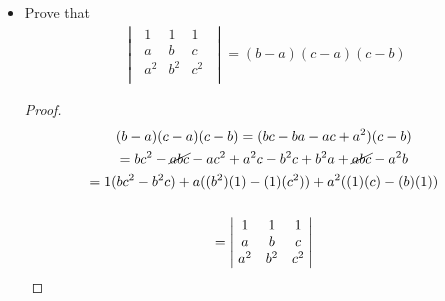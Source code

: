 \documentclass[10pt]{extarticle}
\newcommand{\itembf}[1]{\item[\textbf{#1}]}
\begin{document}
\begin{itemize}
			
		(e) $\begin{vmatrix}
				\; 2 & -1 & 3 & 1  \;\\
				\; 0 & 2 & -2 & -1 \;\\
				\; 4 & -2 & 1 & 0  \;\\
				\; 0 & 2 & -7 & -3  \;\\
			\end{vmatrix}=-5
			\begin{vmatrix}
				\; 2 & -1  & 1  \;\\
				\; 4 & -2  & 0  \;\\
				\; 0 & 2   & -3  \;\\
			\end{vmatrix}+2
			\begin{vmatrix}
				\; 2 & -1 & 3  \;\\
				\; 4 & -2 & 1  \;\\
				\; 0 & 2 & -7  \;\\
			\end{vmatrix} =-5(2((-2)(-3)-(2)(0))+4((2)(1)-(-1)(-3)))+2(2((-2)(-7)-(2)(1))+4((2)(3)-(-1)(-7)))=-5(8)+2(20)=0$\\ \\
			
			
			(f) $\begin{vmatrix}
				\; 1 & 1 & 1 & 1  \;\\
				\; 1 & 2 & 3 & 4 \;\\
				\; 1 & 3 & 6 & 10  \;\\
				\; 1 & 4 & 10 & 20  \;\\
			\end{vmatrix}=(40-60+24)-(20-30+16)+(20-30+16)+(20-20+4)-(6-8+3)=1$
		
		
		
		\itembf{13.} Prove that
			\begin{gather*}
				\begin{vmatrix}
					\;  1 & 1 & 1 \;\\
					\; a &b & c  \;\\
					\; a^2 & b^2 & c^2  \;\\
				\end{vmatrix}
				=(b-a)(c-a)(c-b)
			\end{gather*}
		
		\begin{proof}
			\begin{gather*}
				(b-a)(c-a)(c-b)=(bc-ba-ac+a^2)(c-b)
				\\
				=bc^2-\cancel{abc}-ac^2+a^2c-b^2c+b^2a+\cancel{abc}-a^2b
				\\
				=1(bc^2-b^2c)+a((b^2)(1)-(1)(c^2))+a^2((1)(c)-(b)(1))
				\\
				\\
				=	\begin{vmatrix}
					\;  1 & 1 & 1 \;\\
					\; a &b & c  \;\\
					\; a^2 & b^2 & c^2  \;\\
				\end{vmatrix}
			\end{gather*}
		\end{proof}
		

\end{itemize}
\end{document}
